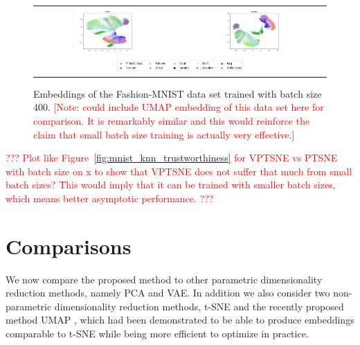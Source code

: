 \begin{figure}[!htb]
  \centering
  \begin{tabular}{cc}
    \includegraphics[width=0.45\textwidth]{images/fashion_mnist_ptsne_embedding.png} &
    \includegraphics[width=0.45\textwidth]{images/fashion_mnist_vptsne_embedding.png} \\
    \multicolumn{2}{c}{\includegraphics[width=0.45\textwidth]{images/fashion_mnist_legend.png}}
  \end{tabular}
  \caption{Embeddings of the Fashion-MNIST data set trained with batch size 400. \textcolor{red}{[Note: could include UMAP embedding of this data set here for comparison. It is remarkably similar and this would reinforce the claim that small batch size training is actually very effective.]}}
  \label{fig:fashion_mnist_comparison}
\end{figure}

\textcolor{red}{??? Plot like Figure~\ref{fig:mnist_knn_trustworthiness} for VPTSNE vs PTSNE with batch size on x to show that VPTSNE does not suffer that much from small batch sizes? This would imply that it can be trained with smaller batch sizes, which means better asymptotic performance. ???} 

\section{Comparisons}
\label{subsection:comparisons}

We now compare the proposed method to other parametric dimensionality reduction methods, namely PCA and VAE. In addition we also consider two non-parametric dimensionality reduction methods, t-SNE and the recently proposed method UMAP \citep{umap}, which had been demonstrated to be able to produce embeddings comparable to t-SNE while being more efficient to optimize in practice.


